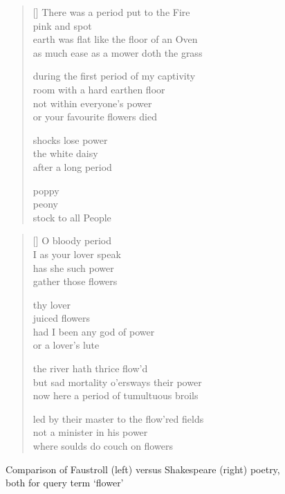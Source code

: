 \begin{figure}[h!]
\centering
\begin{minipage}{.45\linewidth}
  \settowidth{\versewidth}{earth was flat like the floor of an Oven}
  \begin{verse}[\versewidth]\sffamily\footnotesize
    There was a period put to the Fire\\
    pink and spot\\
    earth was flat like the floor of an Oven\\
    as much ease as a mower doth the grass

    during the first period of my captivity\\
    room with a hard earthen floor\\
    not within everyone's power\\
    or your favourite flowers died

    shocks lose power\\
    the white daisy\\
    after a long period

    poppy\\
    peony\\
    stock to all People
  \end{verse}
\end{minipage}
\hspace{.02\linewidth}
\begin{minipage}{.45\linewidth}
  \settowidth{\versewidth}{led by their master to the flow'red fields}
  \begin{verse}[\versewidth]\sffamily\footnotesize
    O bloody period\\
    I as your lover speak\\
    has she such power\\
    gather those flowers

    thy lover\\
    juiced flowers\\
    had I been any god of power\\
    or a lover's lute

    the river hath thrice flow'd\\
    but sad mortality o'ersways their power\\
    now here a period of tumultuous broils

    led by their master to the flow'red fields\\
    not a minister in his power\\
    where soulds do couch on flowers
  \end{verse}
\end{minipage}
\caption[Faustroll vs. Shakespeare poetry]{Comparison of Faustroll (left) versus Shakespeare (right) poetry, both for query term `flower'}
\label{fig:2poems}
\end{figure}

